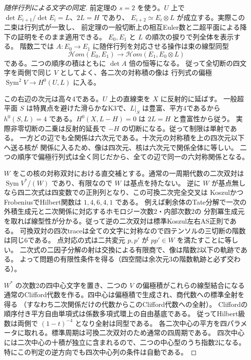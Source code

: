\begin{proof}[随伴行列による文字の同定]
前定理の $s=2$ を使う。$U$ 上で $\det E_{i+1}/\det E_i=L$、$2L=H$ であり、
$E_{i+2}\simeq E_i\otimes L$ が成立する。実際この二束は行列式が一致し、
前定理の一般切断上の相互Euler数と二超平面による降下の証明をそのまま適用できる。
$E_0,E_1$ と $L$ の順次の捩りで列全体を表示する。
階数二では $A:E_0\to E_1$ に随伴行列を対応させる操作は束の線型同型
\[
 \mathcal Hom(E_0,E_1)\longrightarrow\mathcal Hom(E_1,E_0\otimes L)
\]
である。二つの順序の積はともに $\det A$ 倍の恒等になる。
従って全切断の四文字を両側で同じ $V$ としてよく、各二次の対称積の像は
行列式の偏極 $\operatorname{Sym}^2V\to H^0(U,L)$ に入る。

この右辺の次元は高々4である。$U$ 上の直線束を $X$ に反射的に延ばす。
一般超平面 $S$ は特異点を避けた滑らかなK3で、$L|_S$ は豊富、平方4であるから
$h^0(S,L)=4$ である。$H^0(X,L-H)=0$ は $2L=H$ と豊富性から従う。
実際非零切断の二乗は反射的延長で $-H$ の切断になる。従って制限は単射である。
一方どの辺でも全関係は六次元である。十次元の対称積を上の四次元以下へ送る核が
関係に入るため、像は四次元、核は六次元で関係全体に等しい。
二つの順序で偏極行列式は全く同じだから、全ての辺で同一の六対称関係となる。

$W$ をこの核の対称双対における直交補とする。通常の一周期代数の二次双対は
$\operatorname{Sym}V^*/(W)$ であり、有限なので $W$ は基点を持たない。
逆に $W$ が基点無しなら四二次式は四変数での正則列となり、この可換二次完全交叉は
KoszulかつFrobeniusでHilbert関数は $1,4,6,4,1$ である。
例えば剰余体のTate分解で一次の外積生成元と二次関係に対応するホモロジー次数2・内部次数2の
分割冪生成元を取れば線型性が分かる。従って逆の二次双対は標準Koszul左右AS正則である。
可換双対の四次traceは全ての文字に対称なので四テンソルの三切断の階数は同じ6である。
点対応の式は二共変元 $p,p'$ が $p p'\in W$ を満たすことに等しい。
二次式の二因子分解の射は交換による有限商で、像は階数2以下の軌跡である。
よって問題の有限性条件を得る（四空間は余次元3の階数軌跡と必ず交わる）。

$W^*$ の次数2の四中心文字を置き、二つの $V$ の偏極積がこれらの線型結合になる
通常のClifford代数を作る。四中心は偏極積で生成され、商代数への標準全射を得る
（すなわち二次関係だけの代数からこのClifford代数への全射）。
Cliffordの順序付き平方自由単項式は係数多項式環上の自由基底である。
従ってHilbert級数は両側で $(1-t)^{-4}$ となり全射は同型である。
各二次中心の平方を四パラメータに取れる。標準周期は可換二次双対のため通常の四周期である。
四次中心には二次中心の十積が独立に含まれるので、二つの中心型のうち指数2になる。
特にこの判定の逆方向でも四次中心列の条件は自動である。
\end{proof}

